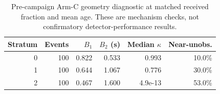 \begin{table}[!t]
\caption{Pre-campaign Arm-C geometry diagnostic at matched received fraction and mean age. These are mechanism checks, not confirmatory detector-performance results.}
\label{tab:diagnostic-arm-c}
\centering\scriptsize
\setlength{\tabcolsep}{2.5pt}
\begin{tabular}{rrrrrr}
\toprule
Stratum & Events & $B_1$ & $B_2$ (s) & Median $\kappa$ & Near-unobs. \\
\midrule
0 & 100 & 0.822 & 0.533 & 0.993 & 10.0\% \\
1 & 100 & 0.644 & 1.067 & 0.776 & 30.0\% \\
2 & 100 & 0.467 & 1.600 & 4.9e-13 & 53.0\% \\
\bottomrule
\end{tabular}
\end{table}
